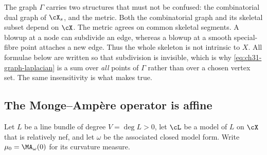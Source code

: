 \begin{remark}
\label{rem:ch31-lengths}
The graph $\Gamma$ carries two structures that must not be confused: the
combinatorial dual graph of $\cX_s$, and the metric.  Both the combinatorial graph and its skeletal subset depend on $\cX$.
The metric agrees on common skeletal segments.  A blowup at a node can
subdivide an edge, whereas a blowup at a smooth special-fibre point
attaches a new edge.  Thus the whole skeleton is not intrinsic to $X$.  All formulae below
are written so that subdivision is invisible, which is why
\eqref{eq:ch31-graph-laplacian} is a sum over \emph{all} points of
$\Gamma$ rather than over a chosen vertex set.  The same insensitivity is
what makes  true.
\end{remark}

\subsection{The Monge--Amp\`ere operator is affine}
\label{sec:ch31-curve-affine}

Let $L$ be a line bundle of degree $V=\deg L>0$, let $\cL$ be a model
of $L$ on $\cX$ that is relatively nef, and let $\omega$ be the
associated closed model form.  Write
$\mu_0=\MA_\omega(0)$ for its curvature measure.

